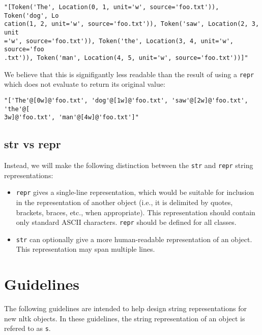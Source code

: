 \documentclass[11pt]{article}
\begin{document}
\begin{verbatim}
"[Token('The', Location(0, 1, unit='w', source='foo.txt')), Token('dog', Lo
cation(1, 2, unit='w', source='foo.txt')), Token('saw', Location(2, 3, unit
='w', source='foo.txt')), Token('the', Location(3, 4, unit='w', source='foo
.txt')), Token('man', Location(4, 5, unit='w', source='foo.txt'))]"
\end{verbatim}

    We believe that this is signifigantly less readable than the
    result of using a \texttt{repr} which does not evaluate to return
    its original value:

\begin{verbatim}
"['The'@[0w]@'foo.txt', 'dog'@[1w]@'foo.txt', 'saw'@[2w]@'foo.txt', 'the'@[
3w]@'foo.txt', 'man'@[4w]@'foo.txt']"
\end{verbatim}

  \subsection{str vs repr}

    Instead, we will make the following distinction between the
    \texttt{str} and \texttt{repr} string representations:

    \begin{itemize}

      \item \texttt{repr} gives a single-line representation, which
          would be suitable for inclusion in the representation of
          another object (i.e., it is delimited by quotes, brackets,
          braces, etc., when appropriate).  This representation should
          contain only standard ASCII characters.  \texttt{repr}
          should be defined for all classes.

      \item \texttt{str} can optionally give a more human-readable
          representation of an object.  This representation may span
          multiple lines.
    \end{itemize}

\section{Guidelines}

  The following guidelines are intended to help design string
  representations for new nltk objects.  In these guidelines, the
  string representation of an object is refered to as \texttt{s}.
\end{document}
